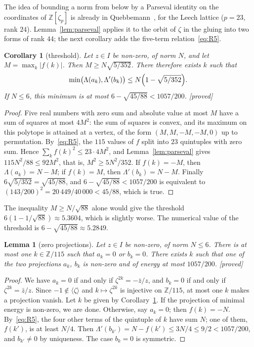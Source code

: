 \documentclass[11pt,a4paper]{amsart}
\theoremstyle{plain}
\newtheorem{lemma}[theorem]{Lemma}
\newtheorem{corollary}[theorem]{Corollary}
\theoremstyle{definition}
\numberwithin{equation}{section}
\newcommand{\Z}{\mathbb{Z}}
\newcommand{\st}[1]{\textup{\textsf{\small[#1]}}}
\newcommand{\DEM}{\st{proved}}
\begin{document}
The idea of bounding a norm from below by a Parseval identity on the coordinates of $\Z[\zeta_p]$ is already in Quebbemann~\cite[p.~168]{Que81}, for the Leech lattice ($p=23$, rank $24$). Lemma~\ref{lem:parseval} applies it to the orbit of $\zeta$ in the gluing into two forms of rank $44$; the next corollary adds the five-term relation~\eqref{eq:R5}.

\begin{corollary}[threshold]\label{cor:seuil}
Let $z\in I$ be non-zero, of norm $N$, and let $M=\max_k|f(k)|$. Then $M\ge N\sqrt{5/352}$. There therefore exists $k$ such that
\[
\min\bigl(\Lambda(a_k),\Lambda'(b_k)\bigr)\le N\Bigl(1-\sqrt{5/352}\Bigr).
\]
If $N\le6$, this minimum is at most $6-\sqrt{45/88}<1057/200$. \DEM
\end{corollary}

\begin{proof}
Five real numbers with zero sum and absolute value at most $M$ have a sum of squares at most $4M^2$: the sum of squares is convex, and its maximum on this polytope is attained at a vertex, of the form $(M,M,-M,-M,0)$ up to permutation. By~\eqref{eq:R5}, the $115$ values of $f$ split into $23$ quintuples with zero sum. Hence $\sum_kf(k)^2\le23\cdot4M^2$, and Lemma~\ref{lem:parseval} gives $115N^2/88\le92M^2$, that is, $M^2\ge5N^2/352$. If $f(k)=-M$, then $\Lambda(a_k)=N-M$; if $f(k)=M$, then $\Lambda'(b_k)=N-M$. Finally $6\sqrt{5/352}=\sqrt{45/88}$, and $6-\sqrt{45/88}<1057/200$ is equivalent to $(143/200)^2=20\,449/40\,000<45/88$, which is true.
\end{proof}

The inequality $M\ge N/\sqrt{88}$ alone would give the threshold $6(1-1/\sqrt{88})\approx5.3604$, which is slightly worse. The numerical value of the threshold is $6-\sqrt{45/88}\approx5.2849$.

\begin{lemma}[zero projections]\label{lem:nul}
Let $z\in I$ be non-zero, of norm $N\le6$. There is at most one $k\in\Z/115$ such that $a_k=0$ or $b_k=0$. There exists $k$ such that one of the two projections $a_k$, $b_k$ is \emph{non-zero} and of energy at most $1057/200$. \DEM
\end{lemma}

\begin{proof}
We have $a_k=0$ if and only if $\zeta^{2k}=-\bar z/z$, and $b_k=0$ if and only if $\zeta^{2k}=\bar z/z$. Since $-1\notin\langle\zeta\rangle$ and $k\mapsto\zeta^{2k}$ is injective on $\Z/115$, at most one $k$ makes a projection vanish. Let $k$ be given by Corollary~\ref{cor:seuil}. If the projection of minimal energy is non-zero, we are done. Otherwise, say $a_k=0$; then $f(k)=-N$. By~\eqref{eq:R5}, the four other terms of the quintuple of $k$ have sum $N$; one of them, $f(k')$, is at least $N/4$. Then $\Lambda'(b_{k'})=N-f(k')\le3N/4\le9/2<1057/200$, and $b_{k'}\ne0$ by uniqueness. The case $b_k=0$ is symmetric.
\end{proof}
\end{document}
